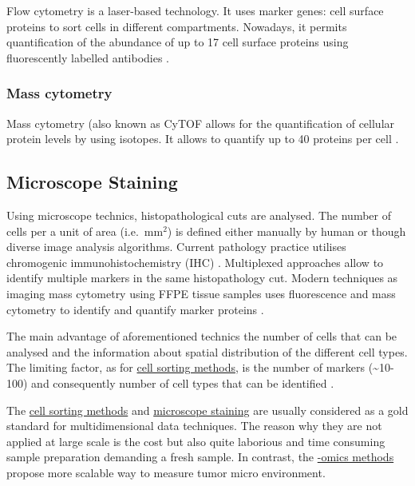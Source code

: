 \documentclass[12pt,]{book}
\theoremstyle{definition}
\theoremstyle{definition}
\theoremstyle{definition}
\theoremstyle{remark}
\begin{document}
Flow cytometry is a laser-based technology. It uses marker genes: cell
surface proteins to sort cells in different compartments. Nowadays, it
permits quantification of the abundance of up to 17 cell surface
proteins using fluorescently labelled antibodies \citep{Papalexi2017}.

\hypertarget{mass-cytometry}{%
\subsubsection{Mass cytometry}\label{mass-cytometry}}

Mass cytometry (also known as CyTOF allows for the quantification of
cellular protein levels by using isotopes. It allows to quantify up to
40 proteins per cell \citep{Papalexi2017}.

\hypertarget{staining}{%
\subsection{Microscope Staining}\label{staining}}

Using microscope technics, histopathological cuts are analysed. The
number of cells per a unit of area (i.e.~mm\(^2\)) is defined either
manually by human or though diverse image analysis algorithms. Current
pathology practice utilises chromogenic immunohistochemistry (IHC)
\citep{RamosVara2010}. Multiplexed approaches allow to identify multiple
markers in the same histopathology cut. Modern techniques as imaging
mass cytometry using FFPE tissue samples uses fluorescence and mass
cytometry to identify and quantify marker proteins \citep{Giesen2014}.

The main advantage of aforementioned technics the number of cells that
can be analysed and the information about spatial distribution of the
different cell types. The limiting factor, as for
\protect\hyperlink{facs}{cell sorting methods}, is the number of markers
(\textasciitilde{}10-100) and consequently number of cell types that can
be identified \citep{Schelker2017}.

The \protect\hyperlink{facs}{cell sorting methods} and
\protect\hyperlink{staining}{microscope staining} are usually considered
as a gold standard for multidimensional data techniques. The reason why
they are not applied at large scale is the cost but also quite laborious
and time consuming sample preparation demanding a fresh sample. In
contrast, the \protect\hyperlink{omics}{-omics methods} propose more
scalable way to measure tumor micro environment.
\end{document}
